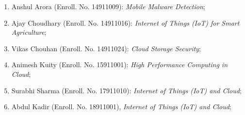 	\begin{enumerate}[label=(PHD\arabic*).]	
			\item Anshul Arora (Enroll. No. 14911009): \textit{Mobile Malware Detection};
			\item Ajay Choudhary (Enroll. No. 14911016): \textit{Internet of Things (IoT) for Smart Agriculture};
			\item Vikas Chouhan (Enroll. No. 14911024): \textit{Cloud Storage Security};
			\item Animesh Kuity (Enroll. No. 15911001): \textit{High Performance Computing in Cloud};			
			\item Surabhi Sharma (Enroll. No. 17911010): \textit{Internet of Things (IoT) and Cloud};	
			\item Abdul Kadir (Enroll. No. 18911001), \textit{Internet of Things (IoT) and Cloud};	 
	\end{enumerate}
